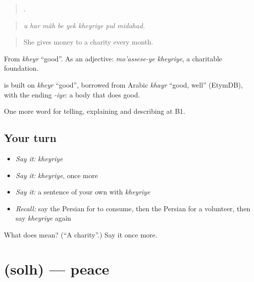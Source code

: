 \begin{quote}
       .
\end{quote}

\begin{quote}
\emph{u har mâh be yek kheyriye pul midahad.}
\end{quote}

\begin{quote}
She gives money to a charity every month.
\end{quote}

From \emph{kheyr} \textquotedblleft{}good\textquotedblright{}. As an adjective: \emph{mo'assese-ye kheyriye}, a charitable foundation.

\begin{cousinweb}
\textbf{} is built on \emph{kheyr} \textquotedblleft{}good\textquotedblright{}, borrowed from Arabic \emph{khayr} \textquotedblleft{}good, well\textquotedblright{} (EtymDB), with the ending \emph{-iye}: a body that does good.
\end{cousinweb}

\begin{grammarlens}[title={What you've built}]
One more word for telling, explaining and describing at B1.
\end{grammarlens}

\subsection*{Your turn}
\begin{itemize}
\raggedright
  \item \emph{Say it:} \emph{kheyriye}
  \item \emph{Say it:} \emph{kheyriye}, once more
  \item \emph{Say it:} a sentence of your own with \emph{kheyriye}
  \item \emph{Recall:} say the Persian for to consume, then the Persian for a volunteer, then say \emph{kheyriye} again
\end{itemize}

\begin{tcolorbox}[breakable,colback=teal!4,colframe=teal!35!black,title={Before you move on}]
What does  mean? (\textquotedblleft{}A charity\textquotedblright{}.) Say it once more.
\end{tcolorbox}
\section[\texorpdfstring{\fa{صلح} (solh)}{صلح (solh)}]{ (solh) — peace}

